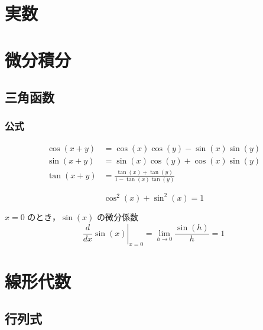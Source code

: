 \documentclass[autodetect-engine,dvipdfmx-if-dvi,ja=standard,a4paper,12pt]{bxjsbook}
\begin{document}
	\tableofcontents
	\part{実数}
	\part{微分積分}
		\chapter{三角函数}
			\section{公式}
				\begin{thm}[加法定理]
						\begin{align}
							\cos(x+y) &= \cos(x)\cos(y) - \sin(x)\sin(y) \\
							\sin(x+y) &= \sin(x) \cos(y) + \cos(x)\sin(y) \\
							\tan(x+y) &= \frac{\tan(x) + \tan(y)}{1 - \tan(x)\tan(y)}
						\end{align}
				\end{thm}
			
				\begin{thm}[ピタゴラスの基本三角函数公式]
					\begin{equation}
						\cos^2(x) + \sin^2(x) = 1
					\end{equation}
				\end{thm}
			
				\begin{thm} $x=0$ のとき，$\sin(x)$ の微分係数
					\begin{equation}
						\left. \frac{d}{dx} \sin(x)\right\lvert_{x=0} = \lim_{h \to 0} \frac{ \sin(h)} {h} = 1
					\end{equation}
				\end{thm}
			
				
	\part{線形代数}
		\chapter{行列式}
\end{document}
